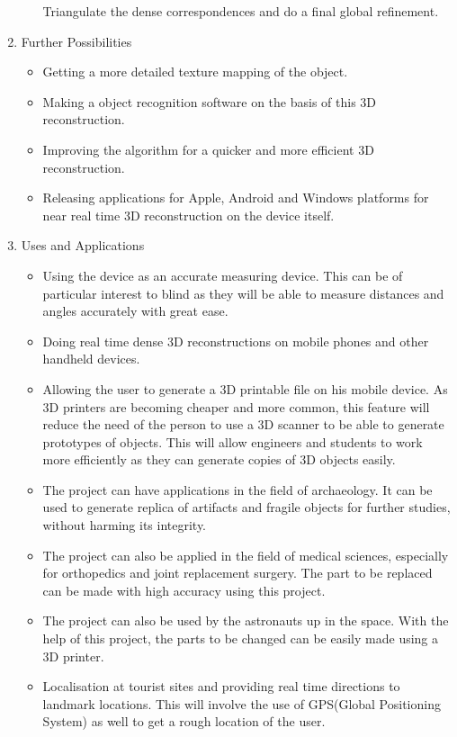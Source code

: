 \documentclass{article}
\begin{document}
\begin{enumerate}
\begin{enumerate}
					Triangulate the dense correspondences and do a final global refinement.					
			\end{enumerate}
			\item Further Possibilities
			\begin{itemize}
			    \item Getting a more detailed texture mapping of the object.
			    \item Making a object recognition software on the basis of this 3D reconstruction.
			    \item Improving the algorithm for a quicker and more efficient 3D reconstruction. 
				\item Releasing applications for Apple, Android and Windows platforms for near real time 3D reconstruction on the device itself.
			\end{itemize}

			\item Uses and Applications
			\begin{itemize}
				\item Using the device as an accurate measuring device. This can be of particular interest to blind as they will be able to measure distances and angles accurately with great ease.
				\item Doing real time dense 3D reconstructions on mobile phones and other handheld devices. 
				\item Allowing the user to generate a 3D printable file on his mobile device. As 3D printers are becoming cheaper and more common, this feature will reduce the need of the person to use a 3D scanner to be able to generate prototypes of objects. This will allow engineers and students to work more efficiently as they can generate copies of 3D objects easily.
				\item The project can have applications in the field of archaeology. It can be used to generate replica of artifacts and fragile objects for further studies, without harming its integrity.
				\item The project can also be applied in the field of medical sciences, especially for orthopedics and joint replacement surgery. The part to be replaced can be made with high accuracy using this project.
				\item The project can also be used by the astronauts up in the space. With the help of this project, the parts to be changed can be easily made using a 3D printer.
				\item Localisation at tourist sites and providing real time directions to landmark locations. This will involve the use of GPS(Global Positioning System) as well to get a rough location of the user.
			\end{itemize}
		\end{enumerate}
\end{document}
